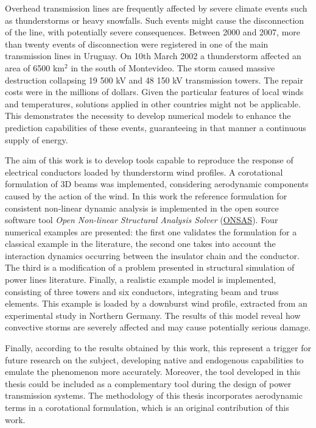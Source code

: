 \begin{foreignabstract}
Overhead transmission lines are frequently affected by severe climate events such as thunderstorms or heavy snowfalls. Such events might cause the disconnection of the line, with potentially severe consequences. Between 2000 and 2007, more than twenty events of disconnection were registered in one of the main transmission lines in Uruguay. On 10th March 2002 a thunderstorm affected an area of 6500 km$^2$ in the south of Montevideo. The storm caused massive destruction collapsing 19 500 kV and 48 150 kV transmission towers. The repair costs were in the millions of dollars. Given the particular features of local winds and temperatures, solutions applied in other countries might not be applicable. This demonstrates the necessity to develop numerical models to enhance the prediction capabilities of these events, guaranteeing in that manner a continuous supply of energy.

The aim of this work is to develop tools capable to reproduce the response of electrical conductors loaded by  thunderstorm wind profiles. A corotational formulation of 3D beams was implemented, considering aerodynamic components caused by the action of the wind. In this work the reference formulation for consistent non-linear dynamic analysis is implemented in the open source software tool  \emph{Open Non-linear Structural Analysis Solver} (\href{https://github.com/ONSAS/ONSAS.m/}{ONSAS}). Four numerical examples are presented: the first one validates the formulation for a classical example in the literature, the second one takes into account the interaction dynamics occurring between the insulator chain and the conductor. The third is a modification of a problem presented in structural simulation of power lines literature.  Finally, a realistic example model is implemented, consisting of three towers and six conductors, integrating beam and truss elements. This example is loaded by a downburst wind profile,  extracted from an experimental study in Northern Germany. The results of this model reveal how convective storms are severely affected and may cause potentially serious damage.

Finally, according to the results obtained by this work, this represent a trigger for future research on the subject, developing native and endogenous capabilities to emulate the phenomenon more accurately. Moreover, the tool developed in this thesis could be included as a complementary tool during the design of power transmission systems. The methodology of this thesis incorporates aerodynamic terms in a corotational formulation, which is an original contribution of this work.  

\end{foreignabstract}